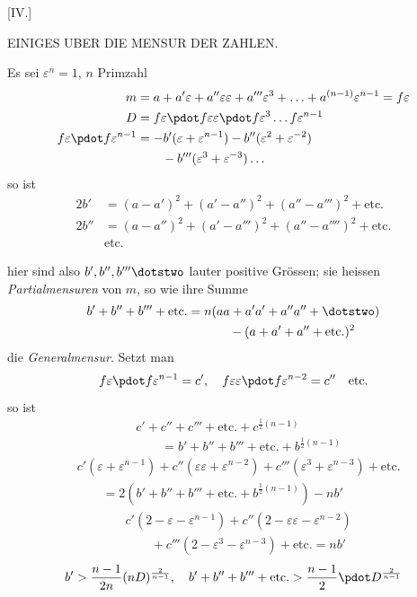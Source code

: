 %
\begin{center}[IV.]\par\medskip
EINIGES UBER DIE MENSUR DER ZAHLEN.
\end{center}
Es sei $\varepsilon^n=1$, $n$ Primzahl
\[
\begin{aligned}
m&=a+a'\varepsilon+a''\varepsilon\varepsilon+a'''\varepsilon^3+\ldots+a^{(n-1)}\varepsilon^{n-1}=f\varepsilon\\
D&=f\varepsilon\pdot f\varepsilon\varepsilon\pdot f\varepsilon^3\ldots f\varepsilon^{n-1}\\
f\varepsilon\pdot f\varepsilon^{n-1}&=-b'(\varepsilon+\varepsilon^{n-1})-b''(\varepsilon^2+\varepsilon^{-2})\\
&\qquad-b'''(\varepsilon^3+\varepsilon^{-3})\ldots
\end{aligned}
\]
so ist
\[
\begin{aligned}
2b'&=(a-a')^2+(a'-a'')^2+(a''-a''')^2+\text{etc.}\\
2b''&=(a-a'')^2+(a'-a''')^2+(a''-a'''')^2+\text{etc.}\\
&\text{etc.}
\end{aligned}
\]

hier sind also $b',b'',b'''\dotstwo$ lauter positive Grössen; sie heissen \emph{Partialmensuren} von $m$, so wie ihre Summe
\[
\begin{aligned}
b'+b''+b'''+\text{etc.}={}&n(aa+a'a'+a''a''+\dotstwo)\\
&\qquad-(a+a'+a''+\text{etc.})^2
\end{aligned}
\]
die \emph{Generalmensur}. Setzt man
\[
f\varepsilon\pdot f\varepsilon^{n-1}=c',\quad f\varepsilon\varepsilon\pdot f\varepsilon^{n-2}=c''\quad\text{etc.}
\]
so ist
\[
\begin{aligned}
&c'+c''+c'''+\text{etc.}+c^{\frac12(n-1)}\\
&\qquad=b'+b''+b'''+\text{etc.}+b^{\frac12(n-1)}
\end{aligned}
\]
\[
\begin{aligned}
&c'(\varepsilon+\varepsilon^{n-1})+c''(\varepsilon\varepsilon+\varepsilon^{n-2})+c'''(\varepsilon^3+\varepsilon^{n-3})+\text{etc.}\\
&\qquad=2(b'+b''+b'''+\text{etc.}+b^{\frac12(n-1)})-nb'
\end{aligned}
\]
\[
\begin{aligned}
&c'(2-\varepsilon-\varepsilon^{n-1})+c''(2-\varepsilon\varepsilon-\varepsilon^{n-2})\\
&\qquad+c'''(2-\varepsilon^3-\varepsilon^{n-3})+\text{etc.}=nb'
\end{aligned}
\]
\[
b'>\frac{n-1}{2n}(nD)^{\frac2{n-1}},\quad b'+b''+b'''+\text{etc.}>\frac{n-1}{2}\pdot D^{\frac2{n-1}}
\]

